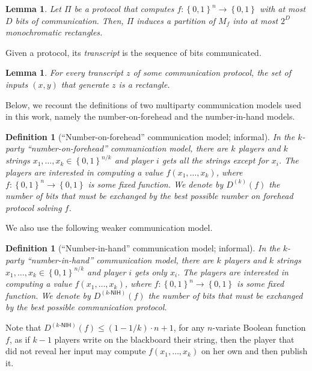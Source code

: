 \documentclass[10pt,a4paper]{article}
\newtheorem{definition}[theorem]{Definition}
\newtheorem{lemma}[theorem]{Lemma}
\newcommand{\bool}{\left\{0,1\right\}}
\newcommand{\prn}[1]{\left(#1\right)}
\newcommand{\cprn}[1]{\!\left(#1\right)}
\begin{document}
	\begin{lemma}
	    Let $\Pi$ be a protocol that computes $f\colon\bool^{n}\to\bool$ with at most $D$ bits of communication. Then, $\Pi$ induces a partition of $M_f$ into at most $2^D$ monochromatic rectangles.
	\end{lemma}
	
	Given a protocol, its \emph{transcript} is the sequence of bits communicated.
	
	\begin{lemma}
	    For every transcript $z$ of some communication protocol, the set of inputs $(x,y)$ that generate $z$ is a rectangle.
	\end{lemma}
	
%
%
%
	
%
%
%

    Below, we recount the definitions of two multiparty communication models used in this work, namely the number-on-forehead and the number-in-hand models.
	
	\begin{definition}[``Number-on-forehead'' communication model; informal]
	    In the $k$-party ``number-on-forehead'' communication model, 
%
	    there are $k$ players and $k$ strings $x_1,\dots,x_k\in\bool^{n/k}$ and player $i$ gets all the strings except for $x_i$. The players are interested in computing a value $f\cprn{x_1,\dots,x_k}$, where $f\colon\bool^{n}\to\bool$ is some fixed function. 
%
	    We denote by $D^{(k)}(f)$ the number of bits that must be exchanged by the best possible number on forehead protocol solving $f$.
    \end{definition}
        
%
    
    We also use the following weaker communication model.
    
    \begin{definition}[``Number-in-hand'' communication model; informal]
	    In the $k$-party ``number-in-hand'' communication model,
%
	    there are $k$ players and $k$ strings $x_1,\dots,x_k\in\bool^{n/k}$ and player $i$ gets only $x_i$.
%
	    The players are interested in computing a value $f\cprn{x_1,\dots,x_k}$, where $f\colon\bool^{n}\to\bool$ is some fixed function.
%
	    We denote by $D^{(k\text{-}\mathsf{NIH})}(f)$ the number of bits that must be exchanged by the best possible communication protocol.
    \end{definition}
    
    Note that $D^{(k\text{-}\mathsf{NIH})}(f)\leq\prn{1-1/k}\cdot n+1$, for any $n$-variate Boolean function $f$, as if $k-1$ players write on the blackboard their string, then the player that did not reveal her input may compute $f\cprn{x_1,\dots,x_k}$ on her own and then publish it.
    
\end{document}
